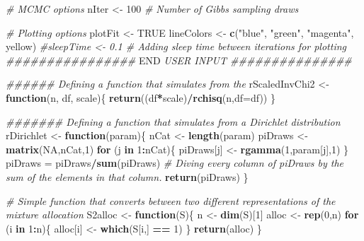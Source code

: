 \documentclass[]{article}
\newenvironment{Shaded}{\begin{snugshade}}{\end{snugshade}}
\newcommand{\CommentTok}[1]{\textcolor[rgb]{0.56,0.35,0.01}{\textit{#1}}}
\newcommand{\ControlFlowTok}[1]{\textcolor[rgb]{0.13,0.29,0.53}{\textbf{#1}}}
\newcommand{\DataTypeTok}[1]{\textcolor[rgb]{0.13,0.29,0.53}{#1}}
\newcommand{\DecValTok}[1]{\textcolor[rgb]{0.00,0.00,0.81}{#1}}
\newcommand{\KeywordTok}[1]{\textcolor[rgb]{0.13,0.29,0.53}{\textbf{#1}}}
\newcommand{\NormalTok}[1]{#1}
\newcommand{\OperatorTok}[1]{\textcolor[rgb]{0.81,0.36,0.00}{\textbf{#1}}}
\newcommand{\OtherTok}[1]{\textcolor[rgb]{0.56,0.35,0.01}{#1}}
\newcommand{\RegionMarkerTok}[1]{#1}
\newcommand{\StringTok}[1]{\textcolor[rgb]{0.31,0.60,0.02}{#1}}
\begin{document}
\begin{Shaded}
\begin{Highlighting}[]
\CommentTok{\# MCMC options}
\NormalTok{nIter \textless{}{-}}\StringTok{ }\DecValTok{100} \CommentTok{\# Number of Gibbs sampling draws}

\CommentTok{\# Plotting options}
\NormalTok{plotFit \textless{}{-}}\StringTok{ }\OtherTok{TRUE}
\NormalTok{lineColors \textless{}{-}}\StringTok{ }\KeywordTok{c}\NormalTok{(}\StringTok{"blue"}\NormalTok{, }\StringTok{"green"}\NormalTok{, }\StringTok{"magenta"}\NormalTok{, }\StringTok{\textquotesingle{}yellow\textquotesingle{}}\NormalTok{)}
\CommentTok{\#sleepTime \textless{}{-} 0.1 \# Adding sleep time between iterations for plotting}
\CommentTok{\#\#\#\#\#\#\#\#\#\#\#\#\#\#\#\#   }\RegionMarkerTok{END}\CommentTok{ USER INPUT \#\#\#\#\#\#\#\#\#\#\#\#\#\#\#}

\CommentTok{\#\#\#\#\#\# Defining a function that simulates from the }
\NormalTok{rScaledInvChi2 \textless{}{-}}\StringTok{ }\ControlFlowTok{function}\NormalTok{(n, df, scale)\{}
  \KeywordTok{return}\NormalTok{((df}\OperatorTok{*}\NormalTok{scale)}\OperatorTok{/}\KeywordTok{rchisq}\NormalTok{(n,}\DataTypeTok{df=}\NormalTok{df))}
\NormalTok{\}}

\CommentTok{\#\#\#\#\#\#\# Defining a function that simulates from a Dirichlet distribution}
\NormalTok{rDirichlet \textless{}{-}}\StringTok{ }\ControlFlowTok{function}\NormalTok{(param)\{}
\NormalTok{  nCat \textless{}{-}}\StringTok{ }\KeywordTok{length}\NormalTok{(param)}
\NormalTok{  piDraws \textless{}{-}}\StringTok{ }\KeywordTok{matrix}\NormalTok{(}\OtherTok{NA}\NormalTok{,nCat,}\DecValTok{1}\NormalTok{)}
  \ControlFlowTok{for}\NormalTok{ (j }\ControlFlowTok{in} \DecValTok{1}\OperatorTok{:}\NormalTok{nCat)\{}
\NormalTok{    piDraws[j] \textless{}{-}}\StringTok{ }\KeywordTok{rgamma}\NormalTok{(}\DecValTok{1}\NormalTok{,param[j],}\DecValTok{1}\NormalTok{)}
\NormalTok{  \}}
\NormalTok{  piDraws =}\StringTok{ }\NormalTok{piDraws}\OperatorTok{/}\KeywordTok{sum}\NormalTok{(piDraws) }\CommentTok{\# Diving every column of piDraws by the sum of the elements in that column.}
  \KeywordTok{return}\NormalTok{(piDraws)}
\NormalTok{\}}

\CommentTok{\# Simple function that converts between two different representations of the mixture allocation}
\NormalTok{S2alloc \textless{}{-}}\StringTok{ }\ControlFlowTok{function}\NormalTok{(S)\{}
\NormalTok{  n \textless{}{-}}\StringTok{ }\KeywordTok{dim}\NormalTok{(S)[}\DecValTok{1}\NormalTok{]}
\NormalTok{  alloc \textless{}{-}}\StringTok{ }\KeywordTok{rep}\NormalTok{(}\DecValTok{0}\NormalTok{,n)}
  \ControlFlowTok{for}\NormalTok{ (i }\ControlFlowTok{in} \DecValTok{1}\OperatorTok{:}\NormalTok{n)\{}
\NormalTok{    alloc[i] \textless{}{-}}\StringTok{ }\KeywordTok{which}\NormalTok{(S[i,] }\OperatorTok{==}\StringTok{ }\DecValTok{1}\NormalTok{)}
\NormalTok{  \}}
  \KeywordTok{return}\NormalTok{(alloc)}
\NormalTok{\}}


\end{Highlighting}
\end{Shaded}
\end{document}
